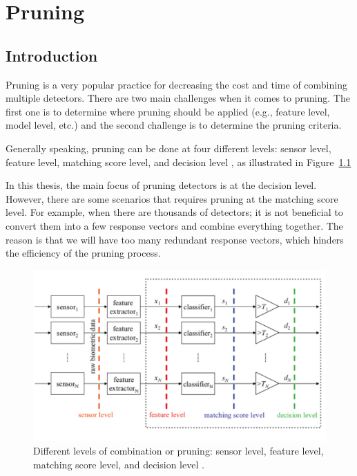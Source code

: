 \chapter{Pruning} \label{chapter3}


 \section{Introduction}
\label{sec:chap3-introduction}

Pruning is a very popular practice for decreasing the cost and time of combining multiple detectors. There are two main challenges when it comes to pruning. The first one is to determine where pruning should be applied (e.g., feature level, model level, etc.) and the second challenge is to determine the pruning criteria.

Generally speaking, pruning can be done at four different levels: sensor level, feature level, matching score level, and decision level \cite{Tao2009}, as illustrated in Figure~\ref{fig::level_of_pruning}

 In this thesis, the main focus of pruning detectors is at the decision level. However, there are some scenarios that requires pruning at the matching score level. For example, when there are thousands of detectors; it is not beneficial to convert them into a few response vectors and combine everything together. The reason is that we will have too many redundant response vectors, which hinders the efficiency of the pruning process.


\begin{figure}[]
\centering
\includegraphics[width=1\linewidth]{figs/level-of-pruning}
\caption{Different levels of combination or pruning: sensor level, feature level, matching score level, and decision level \cite{Tao2009}.}
\label{fig::level_of_pruning}
\end{figure}

